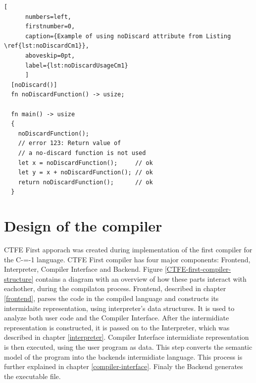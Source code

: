 \begin{minipage}{\linewidth}

	\begin{lstlisting}[
	  numbers=left,
	  firstnumber=0,
	  caption={Example of using noDiscard attribute from Listing \ref{lst:noDiscardCm1}},
	  aboveskip=0pt,
	  label={lst:noDiscardUsageCm1}
	  ]
  [noDiscard()]
  fn noDiscardFunction() -> usize;

  fn main() -> usize
  {
	noDiscardFunction();
	// error 123: Return value of
	// a no-discard function is not used
	let x = noDiscardFunction();     // ok
	let y = x + noDiscardFunction(); // ok
	return noDiscardFunction();      // ok
  }
  \end{lstlisting}
\end{minipage}

\section{Design of the compiler}
\label{compiler-design}

CTFE First apporach was created during implementation of the first compiler for the C-=-1 language\cite{grabski2022compilation}.
CTFE First compiler has four major components: Frontend, Interpreter, Compiler Interface and Backend.
Figure \ref{CTFE-first-compiler-structure} contains a diagram with an overview of how these parts interact with eachother, during the compilaton process.
Frontend, described in chapter \ref{frontend}, parses the code in the compiled language and constructs its intermidaite representation, using interpreter's data structures.
It is used to analyze both user code and the Compiler Interface.
After the intermidiate representation is constructed, it is passed on to the Interpreter, which was described in chapter \ref{interpreter}.
Compiler Interface intermidiate representation is then executed, using the user program as data.
This step converts the semantic model of the program into the backends intermidiate language.
This process is further explained in chapter \ref{compiler-interface}.
Finaly the Backend generates the executable file.

